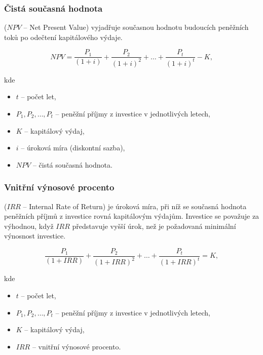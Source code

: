 \subsubsection*{Čistá současná hodnota}
($NPV$ -- Net Present Value)
vyjadřuje současnou hodnotu budoucích peněžních toků po odečtení kapitálového výdaje.

\begin{equation}    
NPV = \frac{P_1}{(1+i)} + \frac{P_2}{(1+i)^2} + \ldots + \frac{P_t}{(1+i)^t} - K,
\end{equation}

kde
\begin{itemize}[label={}]
    \item $t$ -- počet let,
    \item $P_1, P_2, \ldots, P_t$ -- peněžní příjmy z investice v jednotlivých letech,
    \item $K$ -- kapitálový výdaj,
    \item $i$ -- úroková míra (diskontní sazba),
    \item $NPV$ -- čistá současná hodnota.
\end{itemize}

\subsubsection*{Vnitřní výnosové procento}
($IRR$ -- Internal Rate of Return)
je úroková míra, při níž se současná hodnota peněžních příjmů z investice rovná kapitálovým výdajům. Investice se považuje za výhodnou, když $IRR$ představuje vyšší úrok, než je požadovaná minimální výnosnost investice.

\begin{equation}
    \frac{P_1}{(1+IRR)} + \frac{P_2}{(1+IRR)^2} + \ldots + \frac{P_t}{(1+IRR)^t} = K,
\end{equation}

kde
\begin{itemize}[label={}]
    \item $t$ -- počet let,
    \item $P_1, P_2, \ldots, P_t$ -- peněžní příjmy z investice v jednotlivých letech,
    \item $K$ -- kapitálový výdaj,
    \item $IRR$ -- vnitřní výnosové procento.
\end{itemize}

